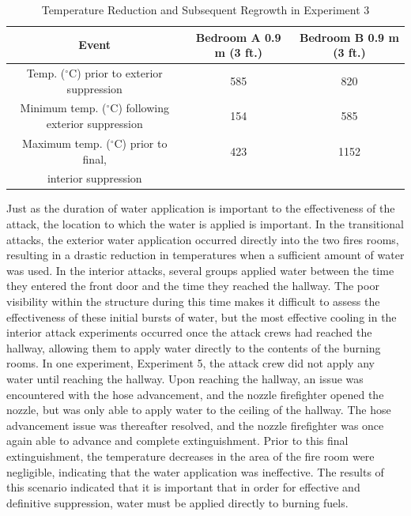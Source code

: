 \documentclass[12pt,oneside]{article}
\begin{document}
\begin{table}[!ht]
    \centering
    \caption{Temperature Reduction and Subsequent Regrowth in Experiment 3}
    \label{tab:exp_3_temps}
    \begin{tabular}{ccc}
    \toprule[1.5pt]
 	 Event 																	&	Bedroom A 0.9 m (3 ft.) &	Bedroom B 0.9 m (3 ft.) \\
 	\midrule 
  	Temp. ($^{\circ}$C) prior to exterior suppression 						&	585						&	820						\\
  	Minimum temp. ($^{\circ}$C) following exterior suppression				&	154						&	585						\\
  	Maximum temp. ($^{\circ}$C) prior to final,								&	423						&	1152					\\
  	 interior suppression													&							&							\\
 	\bottomrule[1.25pt] 
    \end{tabular}
\end{table}

Just as the duration of water application is important to the effectiveness of the attack, the location to which the water is applied is important. In the transitional attacks, the exterior water application occurred directly into the two fires rooms, resulting in a drastic reduction in temperatures when a sufficient amount of water was used. In the interior attacks, several groups applied water between the time they entered the front door and the time they reached the hallway. The poor visibility within the structure during this time makes it difficult to assess the effectiveness of these initial bursts of water, but the most effective cooling in the interior attack experiments occurred once the attack crews had reached the hallway, allowing them to apply water directly to the contents of the burning rooms. In one experiment, Experiment 5, the attack crew did not apply any water until reaching the hallway. Upon reaching the hallway, an issue was encountered with the hose advancement, and the nozzle firefighter opened the nozzle, but was only able to apply water to the ceiling of the hallway. The hose advancement issue was thereafter resolved, and the nozzle firefighter was once again able to advance and complete extinguishment. Prior to this final extinguishment, the temperature decreases in the area of the fire room were negligible, indicating that the water application was ineffective. The results of this scenario indicated that it is important that in order for effective  and definitive suppression, water must be applied directly to burning fuels.
\end{document}
